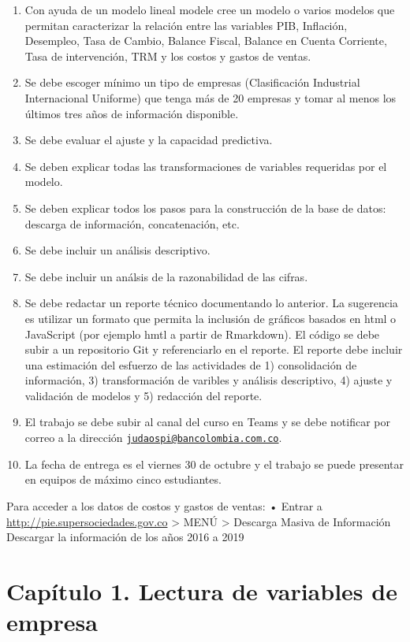 \documentclass[
  11pt,
  a4paper,
]{book}
\begin{document}
\begin{enumerate}
\def\labelenumi{\arabic{enumi}.}
\item
  Con ayuda de un modelo lineal modele cree un modelo o varios modelos
  que permitan caracterizar la relación entre las variables PIB,
  Inflación, Desempleo, Tasa de Cambio, Balance Fiscal, Balance en
  Cuenta Corriente, Tasa de intervención, TRM y los costos y gastos de
  ventas.
\item
  Se debe escoger mínimo un tipo de empresas (Clasificación Industrial
  Internacional Uniforme) que tenga más de 20 empresas y tomar al menos
  los últimos tres años de información disponible.
\item
  Se debe evaluar el ajuste y la capacidad predictiva.
\item
  Se deben explicar todas las transformaciones de variables requeridas
  por el modelo.
\item
  Se deben explicar todos los pasos para la construcción de la base de
  datos: descarga de información, concatenación, etc.
\item
  Se debe incluir un análisis descriptivo.
\item
  Se debe incluir un análsis de la razonabilidad de las cifras.
\item
  Se debe redactar un reporte técnico documentando lo anterior. La
  sugerencia es utilizar un formato que permita la inclusión de gráficos
  basados en html o JavaScript (por ejemplo hmtl a partir de Rmarkdown).
  El código se debe subir a un repositorio Git y referenciarlo en el
  reporte. El reporte debe incluir una estimación del esfuerzo de las
  actividades de 1) consolidación de información, 3) transformación de
  varibles y análisis descriptivo, 4) ajuste y validación de modelos y
  5) redacción del reporte.
\item
  El trabajo se debe subir al canal del curso en Teams y se debe
  notificar por correo a la dirección
  \href{mailto:judaospi@bancolombia.com.co}{\nolinkurl{judaospi@bancolombia.com.co}}.
\item
  La fecha de entrega es el viernes 30 de octubre y el trabajo se puede
  presentar en equipos de máximo cinco estudiantes.
\end{enumerate}

Para acceder a los datos de costos y gastos de ventas: • Entrar a
\url{http://pie.supersociedades.gov.co} \textgreater{} MENÚ
\textgreater{} Descarga Masiva de Información Descargar la información
de los años 2016 a 2019

\hypertarget{capuxedtulo-1.-lectura-de-variables-de-empresa}{%
\chapter{Capítulo 1. Lectura de variables de
empresa}\label{capuxedtulo-1.-lectura-de-variables-de-empresa}}
\end{document}
